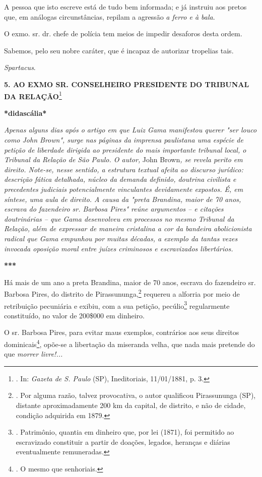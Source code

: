 A pessoa que isto escreve está de tudo bem informada; e já instruiu aos
pretos que, em análogas circunstâncias, repilam a agressão \emph{a ferro
e à bala}.

O exmo. sr. dr. chefe de polícia tem meios de impedir desaforos desta
ordem.

Sabemos, pelo seu nobre caráter, que é incapaz de autorizar tropelias
tais.

\emph{Spartacus}.

\textbf{5. AO EXMO SR.
CONSELHEIRO PRESIDENTE DO TRIBUNAL DA RELAÇÃO}\footnote{. In:
  \emph{Gazeta de S. Paulo} (SP), Ineditoriais, 11/01/1881, p. 3.}

\textbf{*didascália*}

\emph{Apenas alguns dias após o artigo em que Luiz Gama manifestou
querer "ser louco como John Brown", surge nas páginas da imprensa
paulistana uma espécie de petição de liberdade dirigida ao presidente do
mais importante tribunal local, o Tribunal da Relação de São Paulo. O
autor,} John Brown\emph{, se revela perito em direito. Note-se, nesse
sentido, a estrutura textual afeita ao discurso jurídico: descrição
fática detalhada, núcleo da demanda definido, doutrina civilista e
precedentes judiciais potencialmente vinculantes devidamente expostos.
É, em síntese, uma aula de direito. A causa da "preta Brandina, maior de
70 anos, escrava do fazendeiro sr. Barbosa Pires" reúne argumentos -- e
citações doutrinárias -- que Gama desenvolveu em processos no mesmo
Tribunal da Relação, além de expressar de maneira cristalina a cor da
bandeira abolicionista radical que Gama empunhou por muitas décadas, a
exemplo da tantas vezes invocada oposição moral entre juízes criminosos
e escravizados libertários. }

\textbf{***}

Há mais de um ano a preta Brandina, maior de 70 anos, escrava do
fazendeiro sr. Barbosa Pires, do distrito de Pirassununga,\footnote{.
  Por alguma razão, talvez provocativa, o autor qualificou Pirassununga
  (SP), distante aproximadamente 200 km da capital, de distrito, e não
  de cidade, condição adquirida em 1879.} requereu a alforria por meio
de retribuição pecuniária e exibiu, com a sua petição, pecúlio\footnote{.
  Patrimônio, quantia em dinheiro que, por lei (1871), foi permitido ao
  escravizado constituir a partir de doações, legados, heranças e
  diárias eventualmente remuneradas.} regularmente constituído, no valor
de 200\$000 em dinheiro.

O sr. Barbosa Pires, para evitar maus exemplos, contrários aos seus
direitos dominicais\footnote{. O mesmo que senhoriais.}, opõe-se a
libertação da miseranda velha, que nada mais pretende do que
\emph{morrer livre!...}

